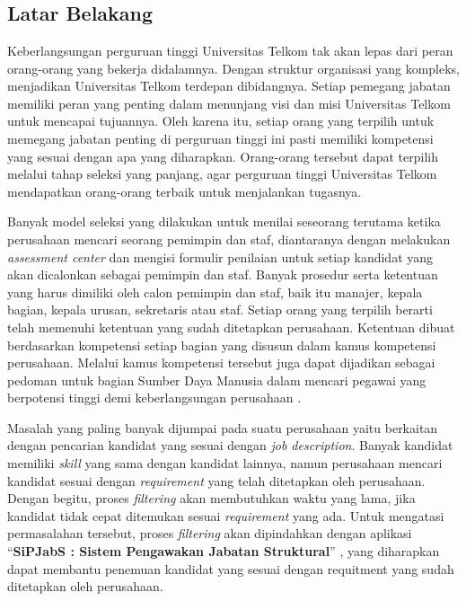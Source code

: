 \chapter{\babSatu}
\section{Latar Belakang}
Keberlangsungan perguruan tinggi Universitas Telkom tak akan lepas dari peran orang-orang yang bekerja didalamnya. Dengan struktur organisasi yang kompleks, menjadikan Universitas Telkom terdepan dibidangnya. Setiap pemegang jabatan memiliki peran yang penting dalam menunjang visi dan misi Universitas Telkom untuk mencapai tujuannya. Oleh karena itu, setiap orang yang terpilih untuk memegang jabatan penting di perguruan tinggi ini pasti memiliki kompetensi yang sesuai dengan apa yang diharapkan. Orang-orang tersebut dapat terpilih melalui tahap seleksi yang panjang, agar perguruan tinggi Universitas Telkom mendapatkan orang-orang terbaik untuk menjalankan tugasnya.

Banyak model seleksi yang dilakukan untuk menilai seseorang terutama ketika perusahaan mencari seorang pemimpin dan staf, diantaranya dengan melakukan \textit{assessment center} dan mengisi formulir penilaian untuk setiap kandidat yang akan dicalonkan sebagai pemimpin dan staf. Banyak prosedur serta ketentuan yang harus dimiliki oleh calon pemimpin dan staf, baik itu manajer, kepala bagian, kepala urusan, sekretaris atau staf. Setiap orang yang terpilih berarti telah memenuhi ketentuan yang sudah ditetapkan perusahaan. Ketentuan dibuat berdasarkan kompetensi setiap bagian yang disusun dalam kamus kompetensi perusahaan. Melalui kamus kompetensi tersebut juga dapat dijadikan sebagai pedoman untuk bagian Sumber Daya Manusia dalam mencari pegawai yang berpotensi tinggi demi keberlangsungan perusahaan \cite{nicho}.

Masalah yang paling banyak dijumpai pada suatu perusahaan yaitu berkaitan dengan pencarian kandidat yang sesuai dengan \textit{job description}. Banyak kandidat memiliki \textit{skill} yang sama dengan kandidat lainnya, namun perusahaan mencari kandidat sesuai dengan \textit{requirement} yang telah ditetapkan oleh perusahaan. Dengan begitu, proses \textit{filtering} akan membutuhkan waktu yang lama, jika kandidat tidak cepat ditemukan sesuai \textit{requirement} yang ada. Untuk mengatasi permasalahan tersebut, proses \textit{filtering} akan dipindahkan dengan aplikasi “\textbf{SiPJabS : Sistem Pengawakan Jabatan Struktural}” , yang diharapkan dapat membantu penemuan kandidat yang sesuai dengan requitment yang sudah ditetapkan oleh perusahaan.
\\

